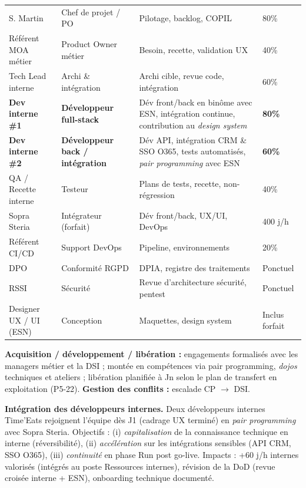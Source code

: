 \documentclass[11pt,a4paper,oneside]{report}
\begin{document}
\renewcommand{\arraystretch}{1.3}
\begin{tabularx}{\textwidth}{L{4cm} L{3cm} Y C{2cm}}
\toprule
{} &  &  &  \\
\midrule
S. Martin             & Chef de projet / PO    & Pilotage, backlog, COPIL                & 80\% \\
Référent MOA métier   & Product Owner métier   & Besoin, recette, validation UX          & 40\% \\
Tech Lead interne     & Archi \& intégration   & Archi cible, revue code, intégration    & 60\% \\
\textbf{Dev interne \#1} & \textbf{Développeur full-stack} & Dév front/back en binôme avec ESN, intégration continue, contribution au \textit{design system} & \textbf{80\%} \\
\textbf{Dev interne \#2} & \textbf{Développeur back / intégration} & Dév API, intégration CRM \& SSO O365, tests automatisés, \textit{pair programming} avec ESN & \textbf{60\%} \\
QA / Recette interne  & Testeur                & Plans de tests, recette, non-régression & 40\% \\
Sopra Steria          & Intégrateur (forfait)  & Dév front/back, UX/UI, DevOps           & 400 j/h \\
Référent CI/CD        & Support DevOps         & Pipeline, environnements                & 20\% \\
DPO                   & Conformité RGPD        & DPIA, registre des traitements          & Ponctuel \\
RSSI                  & Sécurité               & Revue d'architecture sécurité, pentest  & Ponctuel \\
Designer UX / UI (ESN)& Conception            & Maquettes, design system                & Inclus forfait \\
\bottomrule
\end{tabularx}

\textbf{Acquisition / développement / libération :} engagements formalisés avec les
managers métier et la DSI ; montée en compétences via pair programming, \textit{dojos}
techniques et ateliers ; libération planifiée à Jn selon le plan de transfert en
exploitation (P5-22). \textbf{Gestion des conflits :} escalade CP $\rightarrow$ DSI.

\textbf{Intégration des développeurs internes.} Deux développeurs internes Time'Eats
rejoignent l'équipe dès J1 (cadrage UX terminé) en \textit{pair programming} avec
Sopra Steria. Objectifs : (i) \textit{capitalisation} de la connaissance technique en
interne (réversibilité), (ii) \textit{accélération} sur les intégrations sensibles (API CRM,
SSO O365), (iii) \textit{continuité} en phase Run post go-live. Impacts : +60 j/h internes
valorisés (intégrés au poste Ressources internes), révision de la DoD (revue croisée
interne + ESN), onboarding technique documenté.
\end{document}

